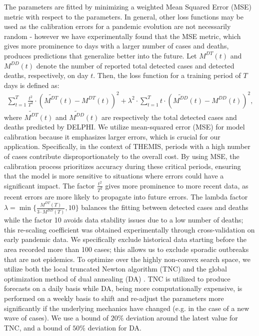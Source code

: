 \documentclass[msom,blindrev]{informs3} %
\begin{document}
\begin{APPENDICES}
The parameters are fitted by minimizing a weighted Mean Squared Error (MSE) metric with respect to the parameters. In general, other loss functions may be used as the calibration errors for a pandemic evolution are not necessarily random - however we have experimentally found that the MSE metric, which gives more prominence to days with a larger number of cases and deaths, produces predictions that generalize better into the future.  Let  $M^{DT}(t)$ and $M^{DD}(t)$ denote  the number of reported total detected cases and detected deaths, respectively, on day $t$. Then, the loss function for a training period of $T$ days is defined as:
$$
\begin{aligned}
\sum_{t=1}^{T} \frac{t^2}{T^2} \cdot \left(\widetilde{M^{DT}}(t) - M^{DT}(t)\right)^2 + \lambda^2 \cdot \sum_{t=1}^{T} t \cdot \left(\widetilde{M^{DD}}(t) - M^{DD}(t)\right)^2,
\end{aligned}
$$
where $\widetilde{M^{DT}}(t)$ and $\widetilde{M^{DD}}(t)$ are respectively the total detected cases and deaths predicted by DELPHI. We utilize mean-squared error (MSE) for model calibration because it emphasizes larger errors, which is crucial for our application. Specifically, in the context of THEMIS, periods with a high number of cases contribute disproportionately to the overall cost. By using MSE, the calibration process prioritizes accuracy during these critical periods, ensuring that the model is more sensitive to situations where errors could have a significant impact. The factor $\frac{t^2}{T^2}$ gives more prominence to more recent data, as recent errors are more likely to propagate into future errors. The lambda factor $\lambda= \min\Big\{ \frac{M^{DT}(T)}{3\cdot M^{DD}(T)}, 10\Big\}$ balances the fitting between detected cases and deaths while the factor 10 avoids data stability issues due to a low number of deaths; this re-scaling coefficient was obtained experimentally through cross-validation on early pandemic data. We specifically exclude historical data starting before the area recorded more than 100 cases; this allows us to exclude sporadic outbreaks that are not epidemics. To optimize over the highly non-convex search space, we utilize both the local truncated Newton algorithm (TNC)  and the global optimization method of dual annealing (DA) . TNC is utilized to produce forecasts on a daily basis while DA, being more computationally expensive, is performed on a weekly basis to shift and re-adjust the parameters more significantly if the underlying mechanics have changed (e.g. in the case of a new wave of cases). We use a bound of $20\%$ deviation around the latest value for TNC, and a bound of $50\%$ deviation for DA.
\vfill
\newpage
\newpage

\end{APPENDICES}
\end{document}
